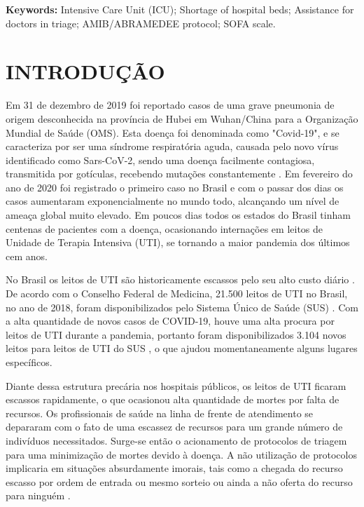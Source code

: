 \documentclass[12pt]{article}
\begin{document}
\textbf{Keywords:} Intensive Care Unit (ICU); Shortage of hospital beds; Assistance for doctors in triage; AMIB/ABRAMEDEE protocol; SOFA scale.

\section{INTRODUÇÃO}

Em 31 de dezembro de 2019 foi reportado casos de uma grave pneumonia de origem desconhecida na província de Hubei em Wuhan/China para a Organização Mundial de Saúde (OMS). Esta doença foi denominada como "Covid-19", e se caracteriza por ser uma síndrome respiratória aguda, causada pelo novo vírus identificado como Sars-CoV-2, sendo uma doença facilmente contagiosa, transmitida por gotículas, recebendo mutações constantemente \cite{sa2020especial}. Em fevereiro do ano de 2020 foi registrado o primeiro caso no Brasil e com o passar dos dias os casos aumentaram exponencialmente no mundo todo, alcançando um nível de ameaça global muito elevado. Em poucos dias todos os estados do Brasil tinham centenas de pacientes com a doença, ocasionando internações em leitos de Unidade de Terapia Intensiva (UTI), se tornando a maior pandemia dos últimos cem anos.

No Brasil os leitos de UTI são historicamente escassos pelo seu alto custo diário \cite{murthy2015intensive}. De acordo com o Conselho Federal de Medicina, 21.500 leitos de UTI no Brasil, no ano de 2018, foram disponibilizados pelo Sistema Único de Saúde (SUS) \cite{cfm2018,cfm2020}. Com a alta quantidade de novos casos de COVID-19, houve uma alta procura por leitos de UTI durante a pandemia, portanto foram disponibilizados 3.104 novos leitos para leitos de UTI do SUS \cite{cotrim2020crescimento}, o que ajudou momentaneamente alguns lugares específicos.

Diante dessa estrutura precária nos hospitais públicos, os leitos de UTI  ficaram escassos rapidamente, o que ocasionou alta quantidade de mortes por falta de recursos. Os profissionais de saúde na linha de frente de atendimento se depararam com o fato de uma escassez de recursos para um grande número de indivíduos necessitados. Surge-se então o acionamento de protocolos de triagem para uma minimização de mortes devido à doença. A não utilização de protocolos implicaria em situações absurdamente imorais, tais como a chegada do recurso escasso por ordem de entrada ou mesmo sorteio ou ainda a não oferta do recurso para ninguém \cite{costa2020protocolos}.
\end{document}

